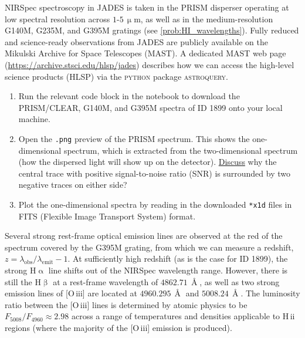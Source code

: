 \documentclass{article}
\newcommand{\HII}{\hbox{H\,{\sc ii}}\xspace}
\newcommand{\OIII}{\hbox{[O\,{\sc iii}]}\xspace}
\newcommand{\Halpha}{\ensuremath{\mathrm{H}\upalpha}\xspace}
\newcommand{\Hbeta}{\ensuremath{\mathrm{H}\upbeta}\xspace}
\theoremstyle{definition}
\begin{document}
NIRSpec spectroscopy in JADES is taken in the PRISM disperser operating at low spectral resolution across $1$-$5 \, \mathrm{\upmu m}$, as well as in the medium-resolution G140M, G235M, and G395M gratings (see \cref{prob:HI_wavelengths}). Fully reduced and science-ready observations from JADES are publicly available on the Mikulski Archive for Space Telescopes (MAST). A dedicated MAST web page (\url{https://archive.stsci.edu/hlsp/jades}) describes how we can access the high-level science products (HLSP) via the \textsc{python} package \textsc{astroquery}.
\begin{enumerate}[label=(\alph*)]
    \item Run the relevant code block in the notebook to download the PRISM/CLEAR, G140M, and G395M spectra of ID 1899 onto your local machine.
    \item Open the \texttt{.png} preview of the PRISM spectrum. This shows the one-dimensional spectrum, which is extracted from the two-dimensional spectrum (how the dispersed light will show up on the detector). \underline{Discuss} why the central trace with positive signal-to-noise ratio (SNR) is surrounded by two negative traces on either side?
    \item Plot the one-dimensional spectra by reading in the downloaded \texttt{*x1d} files in FITS (Flexible Image Transport System) format.
\end{enumerate}

Several strong rest-frame optical emission lines are observed at the red of the spectrum covered by the G395M grating, from which we can measure a redshift, $z = \lambda_\mathrm{obs}/\lambda_\mathrm{emit} - 1$. At sufficiently high redshift (as is the case for ID 1899), the strong \Halpha line shifts out of the NIRSpec wavelength range. However, there is still the \Hbeta at a rest-frame wavelength of $4862.71 \, \Angstrom$, as well as two strong emission lines of \OIII are located at $4960.295 \, \Angstrom$ and $5008.24 \, \Angstrom$. The luminosity ratio between the \OIII lines is determined by atomic physics to be $F_{5008}/F_{4960} \approx 2.98$ across a range of temperatures and densities applicable to \HII regions (where the majority of the \OIII emission is produced).
\end{document}
